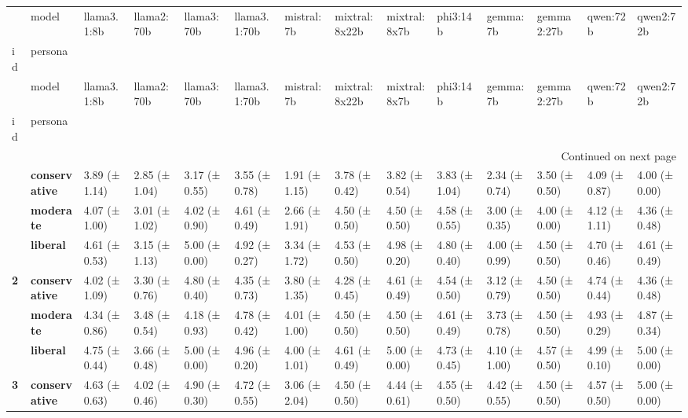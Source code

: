 \begin{longtable}{llllllllllllll}
\toprule
 & model & llama3.1:8b & llama2:70b & llama3:70b & llama3.1:70b & mistral:7b & mixtral:8x22b & mixtral:8x7b & phi3:14b & gemma:7b & gemma2:27b & qwen:72b & qwen2:72b \\
id & persona &  &  &  &  &  &  &  &  &  &  &  &  \\
\midrule
\endfirsthead
\toprule
 & model & llama3.1:8b & llama2:70b & llama3:70b & llama3.1:70b & mistral:7b & mixtral:8x22b & mixtral:8x7b & phi3:14b & gemma:7b & gemma2:27b & qwen:72b & qwen2:72b \\
id & persona &  &  &  &  &  &  &  &  &  &  &  &  \\
\midrule
\endhead
\midrule
\multicolumn{14}{r}{Continued on next page} \\
\midrule
\endfoot
\bottomrule
\endlastfoot
\multirow[t]{3}{*}{\textbf{1}} & \textbf{conservative} & 3.89 (± 1.14) & 2.85 (± 1.04) & 3.17 (± 0.55) & 3.55 (± 0.78) & 1.91 (± 1.15) & 3.78 (± 0.42) & 3.82 (± 0.54) & 3.83 (± 1.04) & 2.34 (± 0.74) & 3.50 (± 0.50) & 4.09 (± 0.87) & 4.00 (± 0.00) \\
\textbf{} & \textbf{moderate} & 4.07 (± 1.00) & 3.01 (± 1.02) & 4.02 (± 0.90) & 4.61 (± 0.49) & 2.66 (± 1.91) & 4.50 (± 0.50) & 4.50 (± 0.50) & 4.58 (± 0.55) & 3.00 (± 0.35) & 4.00 (± 0.00) & 4.12 (± 1.11) & 4.36 (± 0.48) \\
\textbf{} & \textbf{liberal} & 4.61 (± 0.53) & 3.15 (± 1.13) & 5.00 (± 0.00) & 4.92 (± 0.27) & 3.34 (± 1.72) & 4.53 (± 0.50) & 4.98 (± 0.20) & 4.80 (± 0.40) & 4.00 (± 0.99) & 4.50 (± 0.50) & 4.70 (± 0.46) & 4.61 (± 0.49) \\
\cline{1-14}
\multirow[t]{3}{*}{\textbf{2}} & \textbf{conservative} & 4.02 (± 1.09) & 3.30 (± 0.76) & 4.80 (± 0.40) & 4.35 (± 0.73) & 3.80 (± 1.35) & 4.28 (± 0.45) & 4.61 (± 0.49) & 4.54 (± 0.50) & 3.12 (± 0.79) & 4.50 (± 0.50) & 4.74 (± 0.44) & 4.36 (± 0.48) \\
\textbf{} & \textbf{moderate} & 4.34 (± 0.86) & 3.48 (± 0.54) & 4.18 (± 0.93) & 4.78 (± 0.42) & 4.01 (± 1.00) & 4.50 (± 0.50) & 4.50 (± 0.50) & 4.61 (± 0.49) & 3.73 (± 0.78) & 4.50 (± 0.50) & 4.93 (± 0.29) & 4.87 (± 0.34) \\
\textbf{} & \textbf{liberal} & 4.75 (± 0.44) & 3.66 (± 0.48) & 5.00 (± 0.00) & 4.96 (± 0.20) & 4.00 (± 1.01) & 4.61 (± 0.49) & 5.00 (± 0.00) & 4.73 (± 0.45) & 4.10 (± 1.00) & 4.57 (± 0.50) & 4.99 (± 0.10) & 5.00 (± 0.00) \\
\cline{1-14}
\multirow[t]{3}{*}{\textbf{3}} & \textbf{conservative} & 4.63 (± 0.63) & 4.02 (± 0.46) & 4.90 (± 0.30) & 4.72 (± 0.55) & 3.06 (± 2.04) & 4.50 (± 0.50) & 4.44 (± 0.61) & 4.55 (± 0.50) & 4.42 (± 0.55) & 4.50 (± 0.50) & 4.57 (± 0.50) & 5.00 (± 0.00) \\

\end{longtable}
